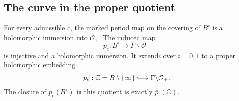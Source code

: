 \subsection{The curve in the proper quotient}\label{fam:section:F.3}

\begin{theorem}\label{fam:src:F.3.1}\label{fam:st:F.3.1}
For every admissible $c$, the marked period map on the covering of
$B^\circ$ is a holomorphic immersion into $\mathcal O_+$.  The induced
map
\[
 p_c:B^\circ\longrightarrow\Gamma\backslash\mathcal O_+
\]
is injective and a holomorphic immersion.  It extends over $t=0,1$ to a
proper holomorphic embedding
\[
 \bar p_c:\mathbb C=B\setminus\{\infty\}
 \lhook\joinrel\longrightarrow\Gamma\backslash\mathcal O_+.
\]
The closure of $p_c(B^\circ)$ in this quotient is exactly
$\bar p_c(\mathbb C)$.
\end{theorem}


